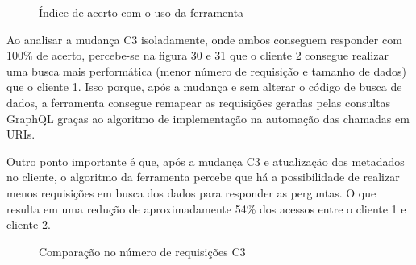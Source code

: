 \begin{figure}[H]
  \centering
  \caption{Índice de acerto com o uso da ferramenta}
\end{figure}

Ao analisar a mudança C3 isoladamente, onde ambos conseguem responder com 100\% de acerto, percebe-se na figura 30 e 31 que o cliente 2 consegue realizar uma busca mais performática (menor número de requisição e tamanho de dados) que o cliente 1. Isso porque, após a mudança e sem alterar o código de busca de dados, a ferramenta consegue remapear as requisições geradas pelas consultas GraphQL graças ao algoritmo de implementação na automação das chamadas em URIs.

Outro ponto importante é que, após a mudança C3 e atualização dos metadados no cliente, o algoritmo da ferramenta percebe que há a possibilidade de realizar menos requisições em busca dos dados para responder as perguntas. O que resulta em uma redução de aproximadamente 54\% dos acessos entre o cliente 1 e cliente 2.

\begin{figure}[H]
  \centering
  \caption{Comparação no número de requisições C3}
\end{figure}

